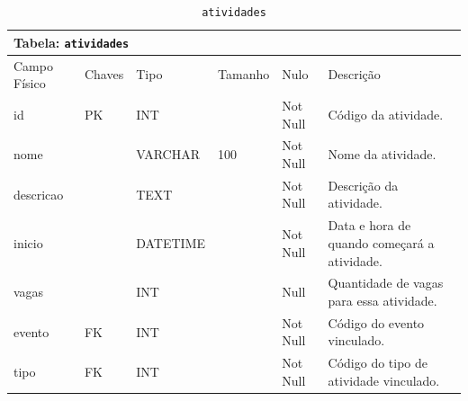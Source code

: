 \documentclass[12pt,a4paper]{article}
\begin{document}
\begin{center}
\begin{table}[h!]
	\caption{\texttt{atividades}}
	\label{tabela:atividades}
	\begin{tabular}{|p{2.3cm}|p{1.2cm}|p{1.8cm}|p{1.5cm}|p{1cm}|p{6cm}|}\hline		
		\multicolumn{6}{|p{16cm}|}{\cellcolor{cinzaClaro}  \centering Tabela: \texttt{atividades}} \\ \hline %
		{\small Campo Físico}   & {\small Chaves} & {\small Tipo} & {\small Tamanho} & {\small Nulo} & {\small Descrição}\\\hline %
		
		{\tiny id}  & {\tiny PK} & {\tiny INT} & {\tiny } & {\tiny Not Null} &{\tiny Código da atividade.}\\\hline
		{\tiny nome}  & {\tiny } & {\tiny VARCHAR} & {\tiny 100} & {\tiny Not Null} &{\tiny Nome da atividade.}\\\hline
		{\tiny descricao}  & {\tiny } & {\tiny TEXT} & {\tiny } & {\tiny Not Null} &{\tiny Descrição da atividade.}\\\hline
		{\tiny inicio}  & {\tiny } & {\tiny DATETIME} & {\tiny } & {\tiny Not Null} &{\tiny Data e hora de quando começará a atividade.}\\\hline
		{\tiny vagas}  & {\tiny } & {\tiny INT} & {\tiny } & {\tiny Null} &{\tiny Quantidade de vagas para essa atividade.}\\\hline
		{\tiny evento}  & {\tiny FK} & {\tiny INT} & {\tiny } & {\tiny Not Null} &{\tiny Código do evento vinculado.}\\\hline
		{\tiny tipo}  & {\tiny FK} & {\tiny INT} & {\tiny } & {\tiny Not Null} &{\tiny Código do tipo de atividade vinculado.}\\\hline
		
			
	\end{tabular}
\end{table}	
\end{center}
\end{document}
